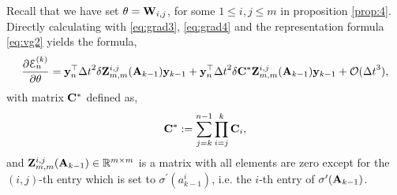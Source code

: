 \documentclass{article} \usepackage{iclr2021_conference,times}
\newcommand{\by}{{\bf y}}
\newcommand{\bW}{{\bf W}}
\newcommand{\bA}{{\bf A}}
\newcommand{\bC}{{\bf C}}
\newcommand{\ord}{{\mathcal O}}
\newcommand{\Dt}{{\Delta t}}
\newcommand{\E}{\EuScript{E}}
\begin{document}
Recall that we have set $\theta = \bW_{i,j}$, for some $1 \leq i,j \leq m$ in proposition \ref{prop:4}. Directly calculating with \eqref{eq:grad3}, \eqref{eq:grad4} and the representation formula \eqref{eq:vg2} yields the formula, 
\begin{equation}
\label{eq:vg4}
\begin{aligned}
\frac{\partial \E^{(k)}_n}{\partial \theta} =  \by_n^\top \Dt^2\delta {\bf Z}^{i,j}_{m,m}(\bA_{k-1}) \by_{k-1} 
+\by_n^\top \Dt^2\delta {\bf C}^{\ast}{\bf Z}^{i,j}_{m,m}(\bA_{k-1}) \by_{k-1} + \ord(\Dt^3),
\end{aligned}
\end{equation}
with matrix ${\bf C}^\ast$ defined as,
$$
{\bf C}^{\ast} := \sum\limits_{j=k}^{n-1} \prod\limits_{i=j}^k \bC_i,
$$
and ${\bf Z}_{m,m}^{i,j}(\bA_{k-1}) \in \mathbb{R}^{m \times m}$ is a matrix with all elements are zero except for the $(i,j)$-th entry which is set to $\sigma^{\prime}(a_{k-1}^i)$, i.e. the $i$-th entry of $\sigma^{\prime}(\bA_{k-1})$.
\end{document}
